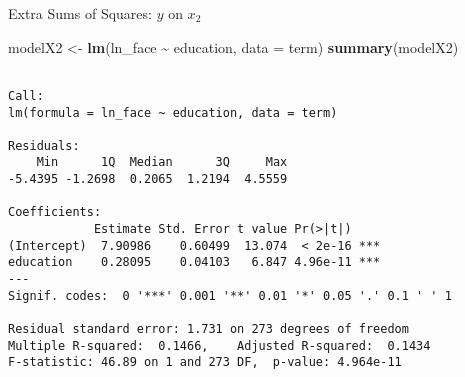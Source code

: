 \documentclass[
  ignorenonframetext,
]{beamer}
\newenvironment{Shaded}{\begin{snugshade}}{\end{snugshade}}
\newcommand{\AttributeTok}[1]{\textcolor[rgb]{0.13,0.29,0.53}{#1}}
\newcommand{\FunctionTok}[1]{\textcolor[rgb]{0.13,0.29,0.53}{\textbf{#1}}}
\newcommand{\NormalTok}[1]{#1}
\newcommand{\OtherTok}[1]{\textcolor[rgb]{0.56,0.35,0.01}{#1}}
\newcommand{\SpecialCharTok}[1]{\textcolor[rgb]{0.81,0.36,0.00}{\textbf{#1}}}
\begin{document}
\begin{frame}[fragile]{Extra Sums of Squares: \(y\) on \(x_2\)}
\protect\hypertarget{extra-sums-of-squares-y-on-x_2}{}
\footnotesize

\begin{Shaded}
\begin{Highlighting}[]
\NormalTok{modelX2 }\OtherTok{\textless{}{-}} \FunctionTok{lm}\NormalTok{(ln\_face }\SpecialCharTok{\textasciitilde{}}\NormalTok{ education, }\AttributeTok{data =}\NormalTok{ term)}
\FunctionTok{summary}\NormalTok{(modelX2)}
\end{Highlighting}
\end{Shaded}

\begin{verbatim}

Call:
lm(formula = ln_face ~ education, data = term)

Residuals:
    Min      1Q  Median      3Q     Max 
-5.4395 -1.2698  0.2065  1.2194  4.5559 

Coefficients:
            Estimate Std. Error t value Pr(>|t|)    
(Intercept)  7.90986    0.60499  13.074  < 2e-16 ***
education    0.28095    0.04103   6.847 4.96e-11 ***
---
Signif. codes:  0 '***' 0.001 '**' 0.01 '*' 0.05 '.' 0.1 ' ' 1

Residual standard error: 1.731 on 273 degrees of freedom
Multiple R-squared:  0.1466,    Adjusted R-squared:  0.1434 
F-statistic: 46.89 on 1 and 273 DF,  p-value: 4.964e-11
\end{verbatim}

\normalsize
\end{frame}
\end{document}
